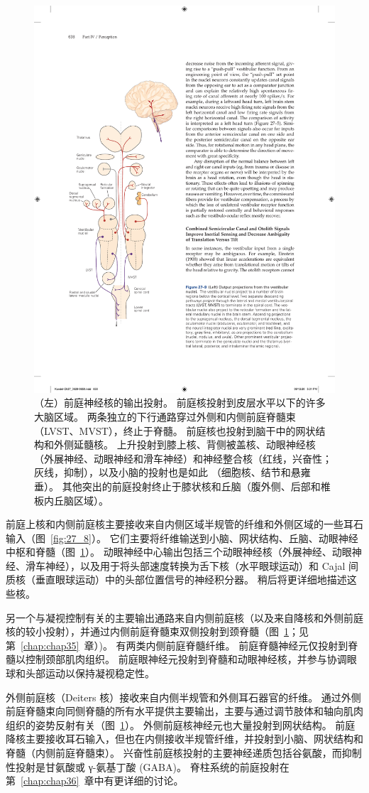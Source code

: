 \begin{figure}[htbp]
	\centering
	\includegraphics[width=0.4\linewidth]{chap27/fig_27_9}
	\caption{（左）前庭神经核的输出投射。 前庭核投射到皮层水平以下的许多大脑区域。 两条独立的下行通路穿过外侧和内侧前庭脊髓束（LVST、MVST），终止于脊髓。 前庭核也投射到脑干中的网状结构和外侧延髓核。 上升投射到膝上核、背侧被盖核、动眼神经核（外展神经、动眼神经和滑车神经）和神经整合核（红线，兴奋性；灰线，抑制），以及小脑的投射也是如此 （细胞核、结节和悬雍垂）。 其他突出的前庭投射终止于膝状核和丘脑（腹外侧、后部和椎板内丘脑区域）。}
	\label{fig:27_9}
\end{figure}


前庭上核和内侧前庭核主要接收来自内侧区域半规管的纤维和外侧区域的一些耳石输入（图~\ref{fig:27_8}）。
它们主要将纤维输送到小脑、网状结构、丘脑、动眼神经中枢和脊髓（图~\ref{fig:27_9}）。
动眼神经中心输出包括三个动眼神经核（外展神经、动眼神经、滑车神经），以及用于将头部速度转换为舌下核（水平眼球运动）和 Cajal 间质核（垂直眼球运动）中的头部位置信号的神经积分器。
稍后将更详细地描述这些核。


另一个与凝视控制有关的主要输出通路来自内侧前庭核（以及来自降核和外侧前庭核的较小投射），并通过内侧前庭脊髓束双侧投射到颈脊髓（图~\ref{fig:27_9}；见第~\ref{chap:chap35}~章）)。
有两类内侧前庭脊髓纤维。
前庭脊髓神经元仅投射到脊髓以控制颈部肌肉组织。
前庭眼神经元投射到脊髓和动眼神经核，并参与协调眼球和头部运动以保持凝视稳定性。


外侧前庭核（Deiters 核）接收来自内侧半规管和外侧耳石器官的纤维。
通过外侧前庭脊髓束向同侧脊髓的所有水平提供主要输出，主要与通过调节肢体和轴向肌肉组织的姿势反射有关（图~\ref{fig:27_9}）。
外侧前庭核神经元也大量投射到网状结构。
前庭降核主要接收耳石输入，但也在内侧接收半规管纤维，并投射到小脑、网状结构和脊髓（内侧前庭脊髓束）。
兴奋性前庭核投射的主要神经递质包括谷氨酸，而抑制性投射是甘氨酸或 γ-氨基丁酸 (GABA)。
脊柱系统的前庭投射在第~\ref{chap:chap36}~章中有更详细的讨论。



